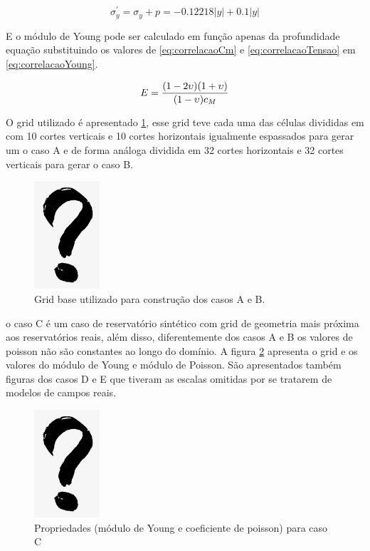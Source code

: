\begin{equation} \label{eq:correlacaoTensao}
\sigma_y^\prime = \sigma_y + p = -0.12218|y| + 0.1 |y|
\end{equation}

E o módulo de Young pode ser calculado em função apenas da profundidade equação substituindo os valores de \ref{eq:correlacaoCm} e \ref{eq:correlacaoTensao} em \ref{eq:correlacaoYoung}.

\begin{equation} \label{eq:correlacaoYoung}
    E = \frac{(1-2\upsilon)(1+\upsilon)}{(1-\upsilon)c_M}
\end{equation}

O grid utilizado é apresentado \ref{fig:gridBase10x10}, esse grid teve cada uma das células divididas em com 10 cortes verticais e 
10 cortes horizontais igualmente espassados para gerar um o caso A e de forma análoga dividida em 32 cortes horizontais e 
32 cortes verticais para gerar o caso B.

\begin{figure}[!htbp]
    \label{fig:gridBase10x10}
    \centering
    \includegraphics[height=4cm]{interrogacao.png}
    \caption{Grid base utilizado para construção dos casos A e B.}
\end{figure}

o caso C é um caso de reservatório sintético com grid de geometria mais próxima aos reservatórios reais, além disso, diferentemente dos casos A e B os valores
de poisson não são constantes ao longo do domínio. A figura \ref{fig:casoCgrid} apresenta o grid e os valores do módulo de Young e módulo de Poisson.
São apresentados também figuras dos casos D e E que tiveram as escalas omitidas por se tratarem de modelos de campos reais.


\begin{figure}[!htbp]
    \label{fig:casoCgrid}
    \centering
    \includegraphics[height=4cm]{interrogacao.png}
    \caption{Propriedades (módulo de Young e coeficiente de poisson) para caso C }
\end{figure}


